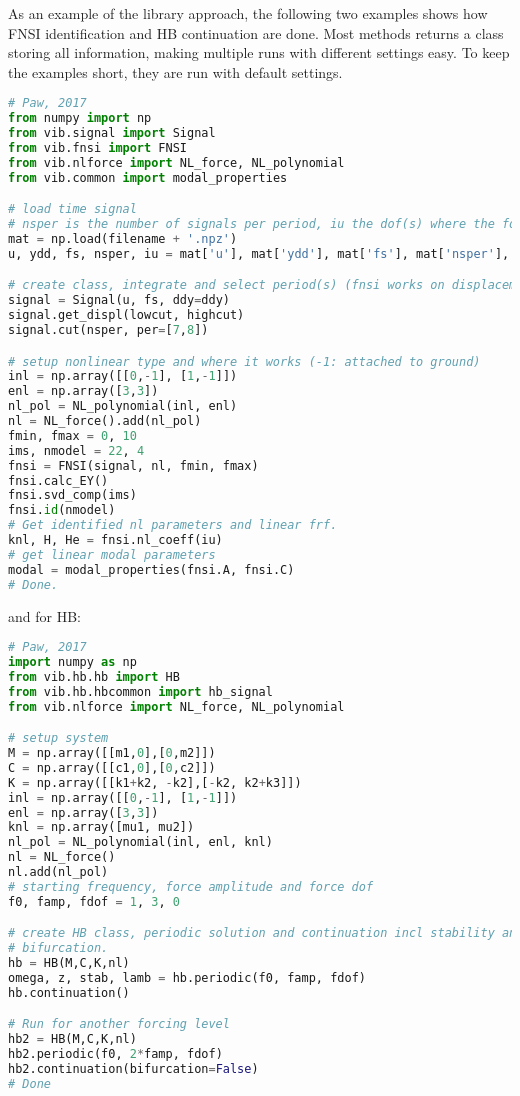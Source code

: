 As an example of the library approach, the following two examples shows how FNSI
identification and HB continuation are done. Most methods returns a class
storing all information, making multiple runs with different settings easy. To
keep the examples short, they are run with default settings.

\begin{lstlisting}[language=Python,frame=single,breaklines=true,basicstyle=\tiny]
# Paw, 2017
from numpy import np
from vib.signal import Signal
from vib.fnsi import FNSI
from vib.nlforce import NL_force, NL_polynomial
from vib.common import modal_properties

# load time signal
# nsper is the number of signals per period, iu the dof(s) where the force(s) works
mat = np.load(filename + '.npz')
u, ydd, fs, nsper, iu = mat['u'], mat['ydd'], mat['fs'], mat['nsper'], mat['iu']

# create class, integrate and select period(s) (fnsi works on displacements)
signal = Signal(u, fs, ddy=ddy)
signal.get_displ(lowcut, highcut)
signal.cut(nsper, per=[7,8])

# setup nonlinear type and where it works (-1: attached to ground)
inl = np.array([[0,-1], [1,-1]])
enl = np.array([3,3])
nl_pol = NL_polynomial(inl, enl)
nl = NL_force().add(nl_pol)
fmin, fmax = 0, 10
ims, nmodel = 22, 4
fnsi = FNSI(signal, nl, fmin, fmax)
fnsi.calc_EY()
fnsi.svd_comp(ims)
fnsi.id(nmodel)
# Get identified nl parameters and linear frf.
knl, H, He = fnsi.nl_coeff(iu)
# get linear modal parameters
modal = modal_properties(fnsi.A, fnsi.C)
# Done.
\end{lstlisting}
and for HB:

\begin{lstlisting}[language=Python,frame=single,breaklines=true,basicstyle=\tiny]
# Paw, 2017
import numpy as np
from vib.hb.hb import HB
from vib.hb.hbcommon import hb_signal
from vib.nlforce import NL_force, NL_polynomial

# setup system
M = np.array([[m1,0],[0,m2]])
C = np.array([[c1,0],[0,c2]])
K = np.array([[k1+k2, -k2],[-k2, k2+k3]])
inl = np.array([[0,-1], [1,-1]])
enl = np.array([3,3])
knl = np.array([mu1, mu2])
nl_pol = NL_polynomial(inl, enl, knl)
nl = NL_force()
nl.add(nl_pol)
# starting frequency, force amplitude and force dof
f0, famp, fdof = 1, 3, 0

# create HB class, periodic solution and continuation incl stability and
# bifurcation.
hb = HB(M,C,K,nl)
omega, z, stab, lamb = hb.periodic(f0, famp, fdof)
hb.continuation()

# Run for another forcing level
hb2 = HB(M,C,K,nl)
hb2.periodic(f0, 2*famp, fdof)
hb2.continuation(bifurcation=False)
# Done
\end{lstlisting}

